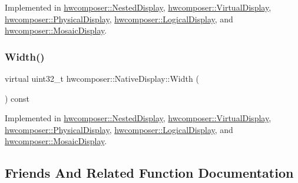 Implemented in \mbox{\hyperlink{classhwcomposer_1_1NestedDisplay_ab6b0f8f36573b7c347805131734f0b47}{hwcomposer\+::\+Nested\+Display}}, \mbox{\hyperlink{classhwcomposer_1_1VirtualDisplay_a96071f0a9aed7cbacbdae71ed3f46e6b}{hwcomposer\+::\+Virtual\+Display}}, \mbox{\hyperlink{classhwcomposer_1_1PhysicalDisplay_a058a5c3a853da43fb76b129cc4e24ef8}{hwcomposer\+::\+Physical\+Display}}, \mbox{\hyperlink{classhwcomposer_1_1LogicalDisplay_adfb3b051b8636f58226bc30da8fe1735}{hwcomposer\+::\+Logical\+Display}}, and \mbox{\hyperlink{classhwcomposer_1_1MosaicDisplay_a3843cd0fcbd50cfed44d7a0ebdf5539b}{hwcomposer\+::\+Mosaic\+Display}}.

\mbox{\label{classhwcomposer_1_1NativeDisplay_a9a18c3dfba567c86c088b06febda4019}} 
\subsubsection{\texorpdfstring{Width()}{Width()}}
{\footnotesize\ttfamily virtual uint32\+\_\+t hwcomposer\+::\+Native\+Display\+::\+Width (\begin{DoxyParamCaption}{ }\end{DoxyParamCaption}) const\hspace{0.3cm}{\ttfamily [pure virtual]}}



Implemented in \mbox{\hyperlink{classhwcomposer_1_1NestedDisplay_ab3c886e199ed0eb383496eb3c3b9da9c}{hwcomposer\+::\+Nested\+Display}}, \mbox{\hyperlink{classhwcomposer_1_1VirtualDisplay_ac860da388ef586d62f6864612db7fa2d}{hwcomposer\+::\+Virtual\+Display}}, \mbox{\hyperlink{classhwcomposer_1_1PhysicalDisplay_a63c3f3123c8d148205e29c177bcd5bd6}{hwcomposer\+::\+Physical\+Display}}, \mbox{\hyperlink{classhwcomposer_1_1LogicalDisplay_a788d88b267f7d36ad6e70f523fd16c97}{hwcomposer\+::\+Logical\+Display}}, and \mbox{\hyperlink{classhwcomposer_1_1MosaicDisplay_a5123a951bd40adef34cbe1e11d0a8e69}{hwcomposer\+::\+Mosaic\+Display}}.



\subsection{Friends And Related Function Documentation}
\mbox{\label{classhwcomposer_1_1NativeDisplay_abf602e1622a3c4c754cc5c979a129a2c}} 
